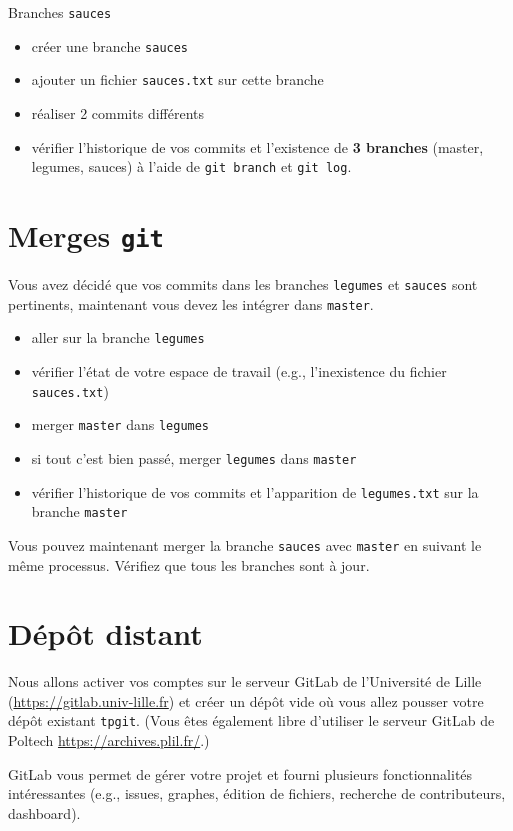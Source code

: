 \documentclass[final, a4paper, openbib, ]{article}
\begin{document}
Branches \texttt{sauces}
\begin{itemize}
\item créer une branche \texttt{sauces}
\item ajouter un fichier \texttt{sauces.txt} sur cette branche
\item réaliser 2 commits différents
\item vérifier l'historique de vos commits et l'existence de \textbf{3 branches} (master, legumes, sauces) à l'aide de \texttt{git branch} et \texttt{git log}.
\end{itemize}


\section{Merges \texttt{git}}
Vous avez décidé que vos commits dans les branches \texttt{legumes} et \texttt{sauces} sont pertinents, maintenant vous devez les intégrer dans \texttt{master}.
\begin{itemize}
\item aller sur la branche \texttt{legumes}
\item vérifier l'état de votre espace de travail (e.g., l'inexistence du fichier \texttt{sauces.txt})
\item merger \texttt{master} dans \texttt{legumes}
\item si tout c'est bien passé, merger \texttt{legumes} dans \texttt{master}
\item vérifier l'historique de vos commits et l'apparition de \texttt{legumes.txt} sur la branche \texttt{master}\\
\end{itemize}

Vous pouvez maintenant merger la branche \texttt{sauces} avec \texttt{master} en suivant le même processus.
Vérifiez que tous les branches sont à jour.

\section{Dépôt distant}

Nous allons activer vos comptes sur le serveur GitLab de l'Université de Lille (\url{https://gitlab.univ-lille.fr}) et créer un dépôt vide où vous allez pousser votre dépôt existant \texttt{tpgit}. (Vous êtes également libre d'utiliser le serveur GitLab de Poltech \url{https://archives.plil.fr/}.)

GitLab vous permet de gérer votre projet et fourni plusieurs fonctionnalités intéressantes (e.g., issues, graphes, édition de fichiers, recherche de contributeurs, dashboard).\\
\end{document}
